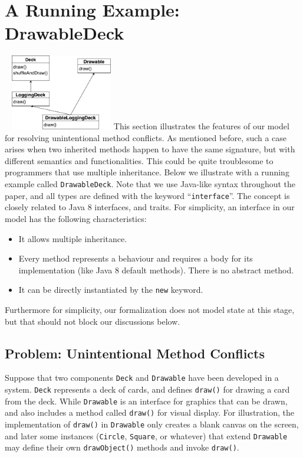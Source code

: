 \section{A Running Example: DrawableDeck}~\label{sec:overview}
\includegraphics[height=3.3cm]{pics/DrawableLoggingDeck.pdf}
This section illustrates the features of our \MIM{} model for resolving unintentional method
conflicts. As mentioned before, such a case arises when two inherited methods happen to have the
same signature, but with different semantics and functionalities. This could be quite troublesome
to programmers that use multiple inheritance. Below we illustrate with a running example called \lstinline|DrawableDeck|.
Note that we use Java-like syntax throughout the paper, and all types are defined with the keyword ``\lstinline|interface|''. The concept
is closely related to Java 8 interfaces, and traits. For simplicity, an interface in our model has the following characteristics:
\begin{itemize}
	\item It allows multiple inheritance.
	\item Every method represents a behaviour and requires a body for its implementation (like Java 8 default methods). There is no abstract method.
	\item It can be directly instantiated by the \lstinline|new| keyword.
\end{itemize}
Furthermore for simplicity, our formalization does not model state at this stage, but that should not block our discussions below.

\subsection{Problem: Unintentional Method Conflicts}

Suppose that two components \lstinline|Deck| and \lstinline|Drawable| have been developed in a system.
\lstinline|Deck| represents a deck of cards, and defines \lstinline|draw()| for drawing a card from the deck.
While \lstinline|Drawable| is an interface for graphics that can be drawn, and also includes a method called \lstinline|draw()|
for visual display. For illustration, the implementation of \lstinline|draw()| in \lstinline|Drawable|
only creates a blank canvas on the screen, and later some instances (\lstinline|Circle|, \lstinline|Square|, or whatever) that extend
\lstinline|Drawable| may define their own \lstinline|drawObject()| methods and invoke \lstinline|draw()|.

